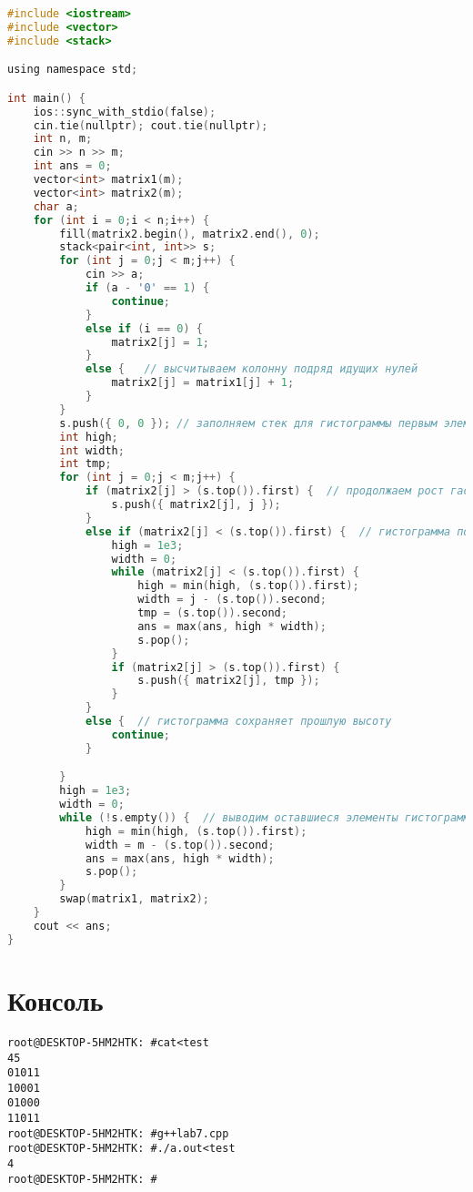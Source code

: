 \begin{lstlisting}[language=C]
#include <iostream>
#include <vector>
#include <stack>

using namespace std;

int main() {
    ios::sync_with_stdio(false);
    cin.tie(nullptr); cout.tie(nullptr);
    int n, m;
    cin >> n >> m;
    int ans = 0;
    vector<int> matrix1(m);
    vector<int> matrix2(m);
    char a;
    for (int i = 0;i < n;i++) {
        fill(matrix2.begin(), matrix2.end(), 0);
        stack<pair<int, int>> s; 
        for (int j = 0;j < m;j++) {
            cin >> a;
            if (a - '0' == 1) {
                continue;
            }
            else if (i == 0) {
                matrix2[j] = 1;
            }
            else {   // высчитываем колонну подряд идущих нулей
                matrix2[j] = matrix1[j] + 1;
            }
        }
        s.push({ 0, 0 }); // заполняем стек для гистограммы первым элементом
        int high;
        int width;
        int tmp;
        for (int j = 0;j < m;j++) {
            if (matrix2[j] > (s.top()).first) {  // продолжаем рост гастограммы
                s.push({ matrix2[j], j });
            }
            else if (matrix2[j] < (s.top()).first) {  // гистограмма понизит максимальную высоту
                high = 1e3;
                width = 0;
                while (matrix2[j] < (s.top()).first) {
                    high = min(high, (s.top()).first);
                    width = j - (s.top()).second;
                    tmp = (s.top()).second;
                    ans = max(ans, high * width);
                    s.pop();
                }
                if (matrix2[j] > (s.top()).first) {
                    s.push({ matrix2[j], tmp });
                }
            }
            else {  // гистограмма сохраняет прошлую высоту
                continue;
            }

        }
        high = 1e3;
        width = 0;
        while (!s.empty()) {  // выводим оставшиеся элементы гистограммы
            high = min(high, (s.top()).first);
            width = m - (s.top()).second;
            ans = max(ans, high * width);
            s.pop();
        }
        swap(matrix1, matrix2);
    }
    cout << ans;
}
\end{lstlisting}


\section{Консоль}
\begin{alltt}
root@DESKTOP-5HM2HTK:~# cat <test
4 5
01011
10001
01000
11011
root@DESKTOP-5HM2HTK:~# g++ lab7.cpp
root@DESKTOP-5HM2HTK:~# ./a.out <test
4
root@DESKTOP-5HM2HTK:~#
\end{alltt}
\pagebreak

